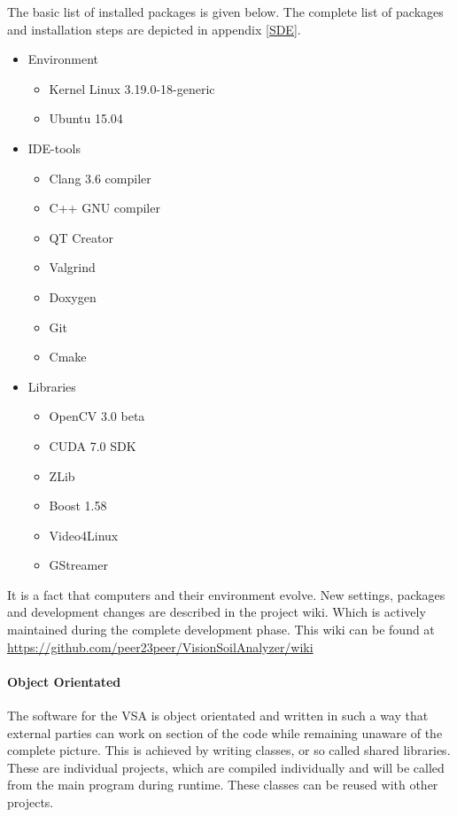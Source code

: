 \documentclass[11pt,fleqn,,a4paper,twoside,openright]{book}
\begin{document}
The basic list of installed packages is given below. The complete list of packages and installation steps are depicted in appendix \ref{SDE}.
\begin{itemize}
	\item Environment
	\begin{itemize}
		\item Kernel Linux 3.19.0-18-generic
		\item Ubuntu 15.04
	\end{itemize}
	\item IDE-tools
	\begin{itemize}
		\item Clang 3.6 compiler
		\item C++ GNU compiler
		\item QT Creator
		\item Valgrind
		\item Doxygen
		\item Git
		\item Cmake
	\end{itemize}
	\item Libraries
	\begin{itemize}
		\item OpenCV 3.0 beta
		\item CUDA 7.0 SDK
		\item ZLib
		\item Boost 1.58
		\item Video4Linux
		\item GStreamer
	\end{itemize}
\end{itemize}
 
 \begin{remark}
 	It is a fact that computers and their environment evolve. New settings, packages and development changes are described in the project wiki. Which is actively maintained during the complete development phase. This wiki can be found at \url{https://github.com/peer23peer/VisionSoilAnalyzer/wiki} 
 \end{remark}

\paragraph{Object Orientated}
The software for the VSA is object orientated and written in such a way that external parties can work on section of the code while remaining unaware of the complete picture. This is achieved by writing classes, or so called shared libraries. These are individual projects, which are compiled individually and will be called from the main program during runtime. These classes can be reused with other projects.
\end{document}
